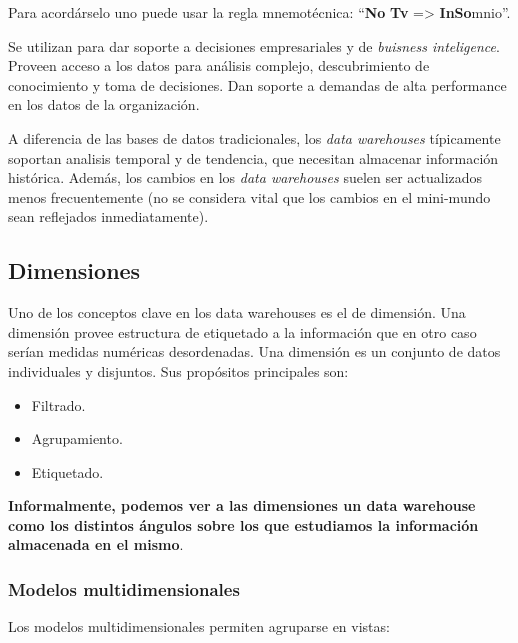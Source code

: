 \documentclass[]{article}
\begin{document}
Para acordárselo uno puede usar la regla mnemotécnica: ``\textbf{No} \textbf{Tv} => \textbf{In}\textbf{So}mnio''.

Se utilizan para dar soporte a decisiones empresariales y de \emph{buisness inteligence}. Proveen acceso a los datos para análisis complejo, descubrimiento de conocimiento y toma de decisiones. Dan soporte a demandas de alta performance en los datos de la organización.

A diferencia de las bases de datos tradicionales, los \emph{data warehouses} típicamente soportan analisis temporal y de tendencia, que necesitan almacenar información histórica. Además, los cambios en los \emph{data warehouses} suelen ser actualizados menos frecuentemente (no se considera vital que los cambios en el mini-mundo sean reflejados inmediatamente).

\subsection{Dimensiones}
Uno de los conceptos clave en los data warehouses es el de dimensión. Una dimensión provee estructura de etiquetado a la información que en otro caso serían medidas numéricas desordenadas. Una dimensión es un conjunto de datos individuales y disjuntos. Sus propósitos principales son:
\begin{itemize}
    \item Filtrado.
    \item Agrupamiento.
    \item Etiquetado.
\end{itemize}


\textbf{Informalmente, podemos ver a las dimensiones un data warehouse como los distintos ángulos sobre los que estudiamos la información almacenada en el mismo}.

\subsubsection{Modelos multidimensionales}
Los modelos multidimensionales permiten agruparse en vistas:
\begin{itemize}
\end{itemize}
\end{document}

